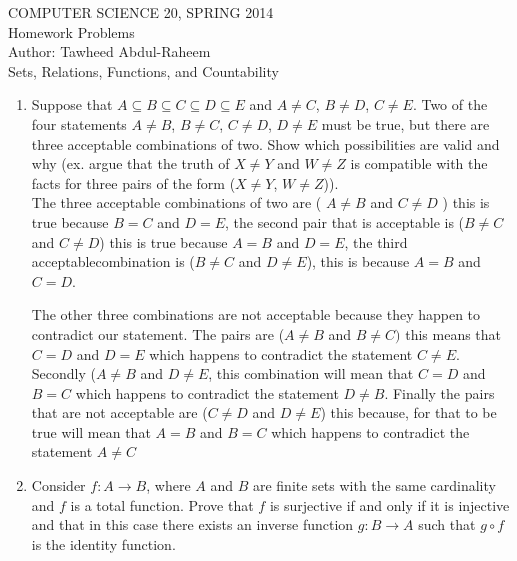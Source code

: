 \documentclass[12pt]{article}
\begin{document}
\begin{center}
COMPUTER SCIENCE 20, SPRING 2014 \\
Homework Problems\\
Author: Tawheed Abdul-Raheem\\
Sets, Relations, Functions, and Countability
\end{center}

\smallskip

\begin{enumerate}
\item Suppose that $A \subseteq B \subseteq C \subseteq D \subseteq E$ and $A \neq C$, $B \neq D$, $C \neq E$. Two of the four statements $A\neq B$, $B \neq C$, $C \neq D$, $D \neq E$ must be true, but there are three acceptable combinations of two. Show which possibilities are valid and why (ex. argue that the truth of $X \neq Y$ and $W \neq Z$ is compatible with the facts for three pairs of the form ($X\neq Y$, $W\neq Z$)).\\

The three acceptable combinations of two are ( $A \neq B$ and $C \neq D$ ) this is true because $B = C$ and $D = E$, the second pair that is acceptable is ($B \neq C$ and $C \neq D$) this is true because $A = B$ and $D = E$, the third acceptablecombination is ($B \neq C$ and $D \neq E$), this is because $A = B$ and $C = D$.

The other three combinations are not acceptable because they happen to contradict our statement. The pairs are ($A \neq B$ and $B  \neq C)$ this means that $C = D$ and $D = E$ which happens to contradict the statement $C \neq E$. Secondly ($A \neq B$ and $D \neq E$, this combination will mean that $C = D$ and $B = C$ which happens to contradict the statement $D \neq B$. Finally the pairs that are not acceptable are ($C \neq D$ and $D \neq E$) this because, for that to be true will mean that $A = B$ and $B = C$ which happens to contradict the statement $A \neq C$

\item Consider $f : A \rightarrow B$, where $A$ and $B$ are finite sets with the same cardinality and $f$ is a total function.  Prove that $f$ is surjective if and only if it is injective and that in this case there exists an inverse function $g : B \rightarrow A$ such that $g \circ f$ is the identity function. \\


\end{enumerate}
\end{document}
